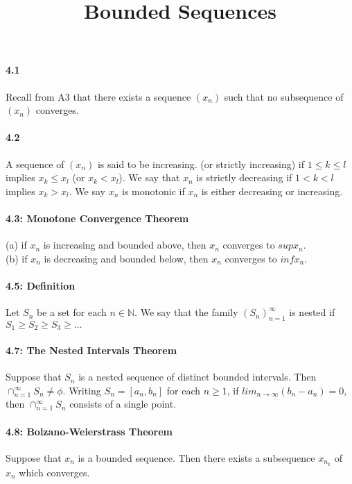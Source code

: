 \documentclass[10pt,letter]{article}
\begin{document}
\title{Bounded Sequences}
\paragraph{4.1}
Recall from A3 that there exists a sequence $(x_n)$ such that no subsequence of $(x_n)$ converges. 

\paragraph{4.2}
A sequence of $(x_n)$ is said to be increasing. (or strictly increasing) if $1 \leq k \leq l$ implies $x_k \leq x_l$ (or $x_k < x_l$). We say that $x_n$ is strictly decreasing if $1 < k < l$ implies $x_k > x_l$. We say $x_n$ is monotonic if $x_n$ is either decreasing or increasing. 

\paragraph{4.3: Monotone Convergence Theorem}
(a) if $x_n$ is increasing and bounded above, then $x_n$ converges to $sup{x_n}$.\\ 
(b) if $x_n$ is decreasing and bounded below, then $x_n$ converges to $inf{x_n}$.

\paragraph{4.5: Definition}
Let $S_n$ be a set for each $n \in \mathbb{N}$. We say that the family $(S_n)_{n=1}^\infty$ is nested if $S_1 \geq S_2 \geq S_3 \geq ...$

\paragraph{4.7: The Nested Intervals Theorem}
Suppose that $S_n$ is a nested sequence of distinct bounded intervals. Then $\cap_{n=1}^\infty S_n \neq \phi$. Writing $S_n = [a_n, b_n]$ for each $n \geq 1$, if $lim_{n\rightarrow\infty}(b_n - a_n) = 0$, then $\cap_{n=1}^\infty S_n$ consists of a single point.

\paragraph{4.8: Bolzano-Weierstrass Theorem}
Suppose that $x_n$ is a bounded sequence. Then there exists a subsequence $x_n_k$ of $x_n$ which converges.
\end{document}
